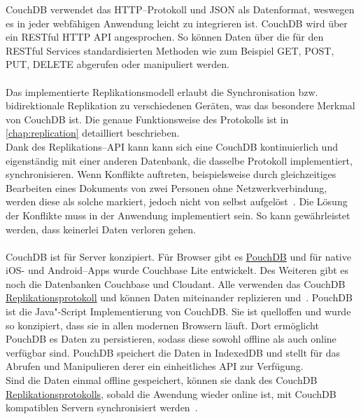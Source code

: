 CouchDB verwendet das \gls{HTTP}--Protokoll und \gls{JSON} als Datenformat, weswegen es in jeder webfähigen Anwendung leicht zu integrieren ist. CouchDB wird über ein \gls{REST}ful \gls{HTTP} \gls{API} angesprochen. So können Daten über die für den \gls{REST}ful Services standardisierten Methoden wie zum Beispiel GET, POST, PUT, DELETE abgerufen oder manipuliert werden.\\\\
%
%
Das implementierte Replikationsmodell erlaubt die Synchronisation bzw. bidirektionale Replikation zu verschiedenen Geräten, was das besondere Merkmal von CouchDB ist.
Die genaue Funktionsweise des Protokolls ist in \autoref{chap:replication} detailliert beschrieben.\\
% 
Dank des Replikations--\gls{API} kann kann sich eine CouchDB kontinuierlich und eigenständig mit einer anderen Datenbank, die dasselbe Protokoll implementiert, synchronisieren.
Wenn Konflikte auftreten, beispielsweise durch gleichzeitiges Bearbeiten eines Dokuments von zwei Personen ohne Netzwerkverbindung, werden diese als solche markiert, jedoch nicht von selbst aufgelöst~\cite{couch}. Die Lösung der Konflikte muss in der Anwendung implementiert sein.
So kann gewährleistet werden, dass keinerlei Daten verloren gehen.\\\\
%
%
CouchDB ist für Server konzipiert. Für Browser gibt es \hyperref[chap:pouch]{PouchDB} und für native iOS- und Android--\glspl{App} wurde Couchbase Lite entwickelt.
Des Weiteren gibt es noch die Datenbanken Couchbase und Cloudant.
Alle verwenden das CouchDB \hyperref[chap:replication]{Replikationsprotokoll} und können Daten miteinander replizieren und~\cite{couch}.
%
%
PouchDB ist die Java"-Script Implementierung von CouchDB.
Sie ist quelloffen und wurde so konzipiert, dass sie in allen modernen Browsern läuft. Dort ermöglicht PouchDB es Daten zu persistieren, sodass diese sowohl offline als auch online verfügbar sind.
PouchDB speichert die Daten in IndexedDB und stellt für das Abrufen und Manipulieren derer ein einheitliches \gls{API} zur Verfügung.\\
Sind die Daten einmal offline gespeichert, können sie dank des CouchDB \hyperref[chap:replication]{Replikationsprotokolls}, sobald die Awendung wieder online ist, mit CouchDB kompatiblen Servern synchronisiert werden~\cite{pouch}.